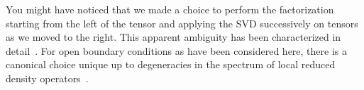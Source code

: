 \documentclass[aps,pra,12pt,nofootinbib,superscriptaddress,longbibliography]{revtex4-1}
\theoremstyle{plain}
\theoremstyle{definition}
\begin{document}




You might have noticed that we made a choice to perform the
factorization starting from the left of the tensor and applying the SVD
successively on tensors as we moved to the right.  This apparent
ambiguity has been characterized in detail~\cite{2006quant.ph..8197P}. 
 For open boundary conditions as have been considered here, there is a canonical choice unique up to degeneracies in
the spectrum of local reduced density operators~\cite{2006quant.ph..8197P}.


\end{document}
